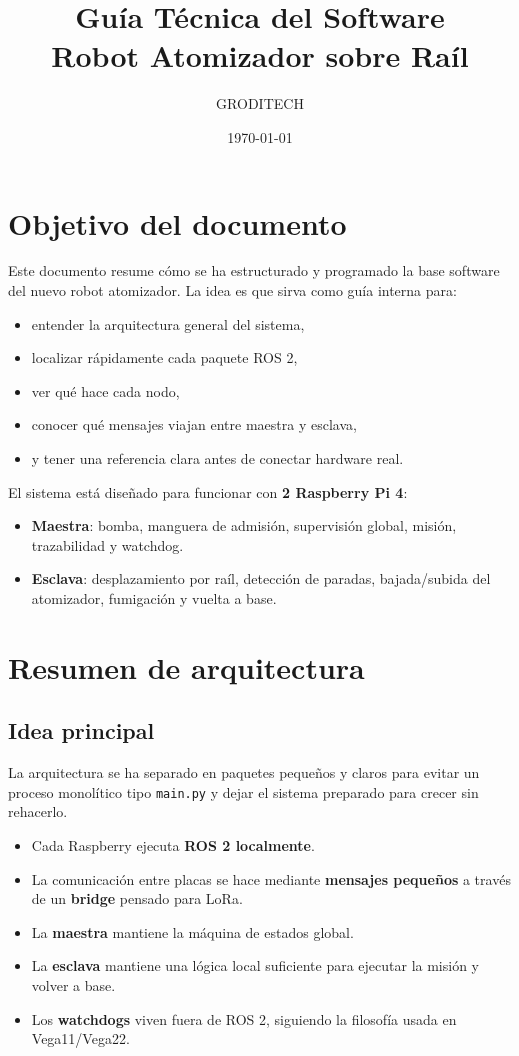 \documentclass[11pt,a4paper]{article}
\title{\textbf{Gu\'ia T\'ecnica del Software}\\Robot Atomizador sobre Ra\'il}
\author{GRODITECH}
\date{\today}
\begin{document}
\maketitle
\tableofcontents
\newpage

\section{Objetivo del documento}
Este documento resume c\'omo se ha estructurado y programado la base software del nuevo robot atomizador. La idea es que sirva como gu\'ia interna para:

\begin{itemize}
    \item entender la arquitectura general del sistema,
    \item localizar r\'apidamente cada paquete ROS 2,
    \item ver qu\'e hace cada nodo,
    \item conocer qu\'e mensajes viajan entre maestra y esclava,
    \item y tener una referencia clara antes de conectar hardware real.
\end{itemize}

El sistema est\'a dise\~nado para funcionar con \textbf{2 Raspberry Pi 4}:

\begin{itemize}
    \item \textbf{Maestra}: bomba, manguera de admisi\'on, supervisi\'on global, misi\'on, trazabilidad y watchdog.
    \item \textbf{Esclava}: desplazamiento por ra\'il, detecci\'on de paradas, bajada/subida del atomizador, fumigaci\'on y vuelta a base.
\end{itemize}

\section{Resumen de arquitectura}
\subsection{Idea principal}
La arquitectura se ha separado en paquetes peque\~nos y claros para evitar un proceso monol\'itico tipo \texttt{main.py} y dejar el sistema preparado para crecer sin rehacerlo.

\begin{itemize}
    \item Cada Raspberry ejecuta \textbf{ROS 2 localmente}.
    \item La comunicaci\'on entre placas se hace mediante \textbf{mensajes peque\~nos} a trav\'es de un \textbf{bridge} pensado para LoRa.
    \item La \textbf{maestra} mantiene la m\'aquina de estados global.
    \item La \textbf{esclava} mantiene una l\'ogica local suficiente para ejecutar la misi\'on y volver a base.
    \item Los \textbf{watchdogs} viven fuera de ROS 2, siguiendo la filosof\'ia usada en Vega11/Vega22.
\end{itemize}
\end{document}
